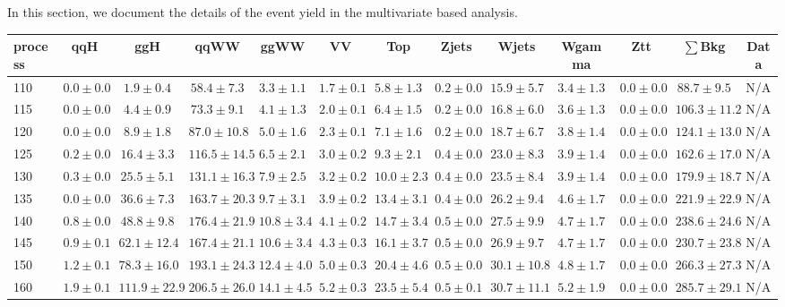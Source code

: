 In this section, we document the details of the event yield in 
the multivariate based analysis.

\begin{table}
{%
 \tiny
 \begin{center}
 \begin{tabular}{l | c c | c c c c c c c c  | c c}
 \hline
 process & qqH & ggH & qqWW & ggWW & VV & Top & Zjets & Wjets & Wgamma & Ztt & $\sum$Bkg & Data \\
 \hline
110 & $0.0\pm0.0$ & $1.9\pm0.4$ & $58.4\pm7.3$ & $3.3\pm1.1$ & $1.7\pm0.1$ & $5.8\pm1.3$ & $0.2\pm0.0$ & $15.9\pm5.7$ & $3.4\pm1.3$ & $0.0\pm0.0$ & $88.7\pm9.5$ & N/A \\
115 & $0.0\pm0.0$ & $4.4\pm0.9$ & $73.3\pm9.1$ & $4.1\pm1.3$ & $2.0\pm0.1$ & $6.4\pm1.5$ & $0.2\pm0.0$ & $16.8\pm6.0$ & $3.6\pm1.3$ & $0.0\pm0.0$ & $106.3\pm11.2$ & N/A \\
120 & $0.0\pm0.0$ & $8.9\pm1.8$ & $87.0\pm10.8$ & $5.0\pm1.6$ & $2.3\pm0.1$ & $7.1\pm1.6$ & $0.2\pm0.0$ & $18.7\pm6.7$ & $3.8\pm1.4$ & $0.0\pm0.0$ & $124.1\pm13.0$ & N/A \\
125 & $0.2\pm0.0$ & $16.4\pm3.3$ & $116.5\pm14.5$ & $6.5\pm2.1$ & $3.0\pm0.2$ & $9.3\pm2.1$ & $0.4\pm0.0$ & $23.0\pm8.3$ & $3.9\pm1.4$ & $0.0\pm0.0$ & $162.6\pm17.0$ & N/A \\
130 & $0.3\pm0.0$ & $25.5\pm5.1$ & $131.1\pm16.3$ & $7.9\pm2.5$ & $3.2\pm0.2$ & $10.0\pm2.3$ & $0.4\pm0.0$ & $23.5\pm8.4$ & $3.9\pm1.4$ & $0.0\pm0.0$ & $179.9\pm18.7$ & N/A \\
135 & $0.0\pm0.0$ & $36.6\pm7.3$ & $163.7\pm20.3$ & $9.7\pm3.1$ & $3.9\pm0.2$ & $13.4\pm3.1$ & $0.4\pm0.0$ & $26.2\pm9.4$ & $4.6\pm1.7$ & $0.0\pm0.0$ & $221.9\pm22.9$ & N/A \\
140 & $0.8\pm0.0$ & $48.8\pm9.8$ & $176.4\pm21.9$ & $10.8\pm3.4$ & $4.1\pm0.2$ & $14.7\pm3.4$ & $0.5\pm0.0$ & $27.5\pm9.9$ & $4.7\pm1.7$ & $0.0\pm0.0$ & $238.6\pm24.6$ & N/A \\
145 & $0.9\pm0.1$ & $62.1\pm12.4$ & $167.4\pm21.1$ & $10.6\pm3.4$ & $4.3\pm0.3$ & $16.1\pm3.7$ & $0.5\pm0.0$ & $26.9\pm9.7$ & $4.7\pm1.7$ & $0.0\pm0.0$ & $230.7\pm23.8$ & N/A \\
150 & $1.2\pm0.1$ & $78.3\pm16.0$ & $193.1\pm24.3$ & $12.4\pm4.0$ & $5.0\pm0.3$ & $20.4\pm4.6$ & $0.5\pm0.0$ & $30.1\pm10.8$ & $4.8\pm1.7$ & $0.0\pm0.0$ & $266.3\pm27.3$ & N/A \\
160 & $1.9\pm0.1$ & $111.9\pm22.9$ & $206.5\pm26.0$ & $14.1\pm4.5$ & $5.2\pm0.3$ & $23.5\pm5.4$ & $0.5\pm0.1$ & $30.7\pm11.1$ & $5.2\pm1.9$ & $0.0\pm0.0$ & $285.7\pm29.1$ & N/A \\

\end{tabular}
\end{center}}
\end{table}
